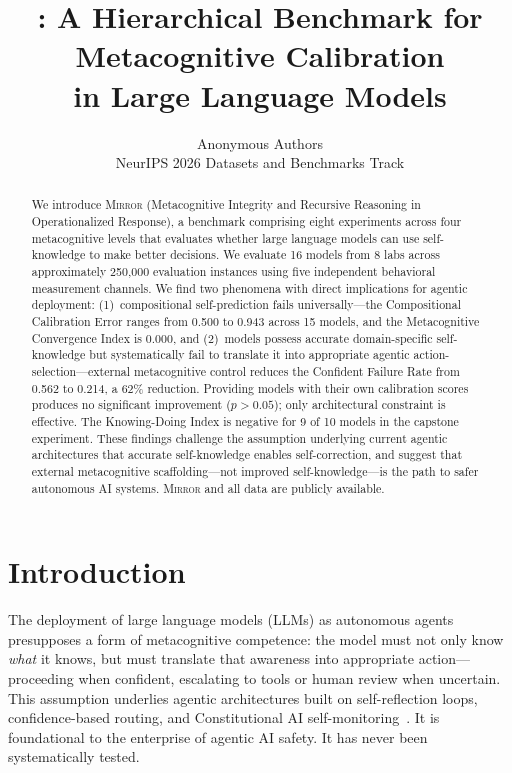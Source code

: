 \documentclass[10pt]{article}
\title{\mirror{}: A Hierarchical Benchmark for Metacognitive Calibration\\in Large Language Models}
\author{
  Anonymous Authors \\
  NeurIPS 2026 Datasets and Benchmarks Track
}
\date{}
\newcommand{\mirror}{\textsc{Mirror}}
\begin{document}
\maketitle

\begin{abstract}
We introduce \mirror{} (Metacognitive Integrity and Recursive Reasoning in
Operationalized Response), a benchmark comprising eight experiments across four
metacognitive levels that evaluates whether large language models can use
self-knowledge to make better decisions. We evaluate 16 models from 8 labs across
approximately 250,000 evaluation instances using five independent behavioral
measurement channels. We find two phenomena with direct implications for agentic
deployment: (1)~compositional self-prediction fails universally---the Compositional
Calibration Error ranges from 0.500 to 0.943 across 15 models, and the
Metacognitive Convergence Index is 0.000, and (2)~models
possess accurate domain-specific self-knowledge but systematically fail to translate
it into appropriate agentic action-selection---external metacognitive control reduces
the Confident Failure Rate from 0.562 to 0.214, a 62\% reduction. Providing models
with their own calibration scores produces no significant improvement ($p > 0.05$);
only architectural constraint is effective. The Knowing-Doing Index is negative for
9 of 10 models in the capstone experiment. These findings challenge the assumption
underlying current agentic architectures that accurate self-knowledge enables
self-correction, and suggest that external metacognitive scaffolding---not improved
self-knowledge---is the path to safer autonomous AI systems. \mirror{} and all data
are publicly available.
\end{abstract}

\section{Introduction}
\label{sec:intro}

The deployment of large language models (LLMs) as autonomous agents presupposes a
form of metacognitive competence: the model must not only know \textit{what} it
knows, but must translate that awareness into appropriate action---proceeding when
confident, escalating to tools or human review when uncertain. This assumption
underlies agentic architectures built on self-reflection loops, confidence-based
routing, and Constitutional AI self-monitoring~\citep{perez2022sycophancy}. It is
foundational to the enterprise of agentic AI safety. It has never been
systematically tested.
\end{document}
